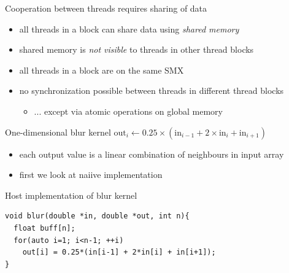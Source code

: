 \begin{frame}[fragile]{}
        Cooperation between threads requires sharing of data
        \begin{itemize}
            \item all threads in a block can share data using \emph{shared memory}
            \item shared memory is \emph{not visible} to threads in other thread blocks
            \item all threads in a block are on the same SMX
            \item no synchronization possible between threads in different thread blocks
            \begin{itemize}
                \item ... except via atomic operations on global memory
            \end{itemize}
        \end{itemize}

\end{frame}

\begin{frame}[fragile]{}
    \begin{info}{One-dimensional blur kernel}
        \centering $\text{out}_i \leftarrow 0.25\times(\text{in}_{i-1}+2\times\text{in}_i+\text{in}_{i+1})$
        \begin{itemize}
            \item each output value is a linear combination of neighbours in input array
            \item first we look at naiive implementation
        \end{itemize}
    \end{info}

    \begin{code}{Host implementation of blur kernel}
        \begin{lstlisting}[style=boxcudatiny]
void blur(double *in, double *out, int n){
  float buff[n];
  for(auto i=1; i<n-1; ++i)
    out[i] = 0.25*(in[i-1] + 2*in[i] + in[i+1]);
}
        \end{lstlisting}
    \end{code}

\end{frame}

